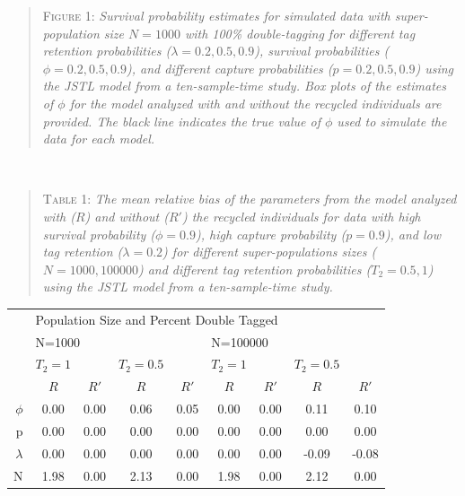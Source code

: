 \documentclass[]{article}
\begin{document}
\begin{quote}
\textsc{Figure 1:}
\textsl{Survival probability estimates for simulated data with super-population size $N=1000$ with 100\% double-tagging for different tag retention probabilities ($\lambda=0.2,0.5,0.9$), survival probabilities ($\phi=0.2,0.5,0.9$), and different capture probabilities ($p=0.2,0.5,0.9$) using the JSTL model from a ten-sample-time study. Box plots of the estimates of $\phi$ for the model analyzed with and without the recycled individuals are provided. The black line indicates the true value of $\phi$ used to simulate the data for each model.}
\end{quote}

~ ~

\begin{quote}
\textsc{Table 1:}
\textsl{The mean relative bias of the parameters from the model analyzed with ($R$) and without ($R'$) the recycled individuals for data with high survival probability ($\phi=0.9$), high capture probability ($p=0.9$), and low tag retention ($\lambda=0.2$)  for different super-populations sizes ($N=1000,100 000$) and different tag retention probabilities ($T_2=0.5,1$) using the JSTL model from a ten-sample-time study. }
\end{quote}

\begin{table}[ht]
\centering
\begin{tabular}{rcccccccc}
  \hline
  & \multicolumn{8}{l}{Population Size and Percent Double Tagged} \\
  \cline{2-9}
  & \multicolumn{4}{l}{N=1000} & \multicolumn{4}{l}{N=100000} \\
  \cline {2-9}
  & $T_2=1$ && $T_2=0.5$ && $T_2=1$ && $T_2=0.5$ &  \\ 
  \cline {2-9}
  & $R$ & $R'$ & $R$ & $R'$ & $R$ & $R'$ & $R$ & $R'$ \\ 
  \hline
$\phi$ & 0.00 & 0.00 & 0.06 & 0.05 & 0.00 & 0.00 & 0.11 & 0.10 \\ 
  p & 0.00 & 0.00 & 0.00 & 0.00 & 0.00 & 0.00 & 0.00 & 0.00 \\ 
  $\lambda$ & 0.00 & 0.00 & 0.00 & 0.00 & 0.00 & 0.00 & -0.09 & -0.08 \\ 
  N & 1.98 & 0.00 & 2.13 & 0.00 & 1.98 & 0.00 & 2.12 & 0.00 \\ 
   \hline
\end{tabular}
\end{table}

~ ~
\end{document}
